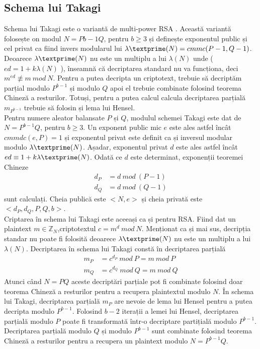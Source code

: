 \documentclass[12]{report}
\begin{document}
		  \subsection{Schema lui Takagi}
		  Schema lui Takagi este o variantă de multi-power RSA \cite{takagi}. Această variantă folosește on modul $N=P{b-1}Q$, pentru $b \geqslant 3$ și definește exponentul public și cel privat ca fiind invers modularul lui $\lambda \textprime (N) =cmmc(P-1,Q-1)$. Deoarece $\lambda \textprime (N)$ nu este un multiplu a lui $\lambda(N)$ unde ( $ed=1+k\lambda(N)$ ), înseamnă că decriptarea standard nu va funcționa, deci $m^{ed} \not\equiv m \ mod \ N$. Pentru a putea decripta un criptotext, trebuie să decriptăm parțial modulo $P^{b-1}$ și modulo $Q$ apoi el trebuie combinate folosind teorema Chineză a resturilor. Totuși, pentru a putea calcul calcula decriptarea parțială $m_{P^{b-1}}$ trebuie să folosin și lema lui Hensel.\\
		  Pentru numere aleator balansate $P$ și $Q$, modulul schemei Takagi este dat de $N=P^{b-1}Q$, pentru $b \geqslant 3$. Un exponent public mic $e$ este ales astfel încât$cmmdc(e,P)=1$ și exponentul privat este definit ca și inversul modular modulo $\lambda \textprime (N)$. Așadar, exponentul privat $d$ este ales astfel încât $ed \equiv 1+k\lambda \textprime (N)$. Odată ce $d$ este determinat, exponenții  teoremei Chineze
		  \begin{align*}
		  d_P &= d \ mod \ (P-1) \\
		  d_Q &= d \ mod \ (Q-1)
		  \end{align*}
sunt calculați. Cheia publică este $<N,e>$ și cheia privată este$<d_P,d_Q,P,Q,b>$. \\
Criptarea în schema lui Takagi este aceeași ca și pentru RSA. Fiind dat un plaintext $ m \in \mathbb{Z}_N$,criptotextul $ c= m^d \ mod \ N$. Menționat ca și mai sus, decripția standar nu poate fi folosită deoarece $ \lambda \textprime (N)$ nu este un multiplu a lui $\lambda(N)$. Decriptarea în  schema lui Takagi constă în decriptarea parțială
\begin{align*}
m_P &= c^{d_P} \ mod \ P = m \ mod \ P \\
m_Q &= c^{d_Q} \ mod \ Q = m \ mod \ Q 
\end{align*} 
Atunci când $N=PQ$ aceste decriptări parțiale pot fi combinate folosind doar teorema Chineză a resturilor pentru a recupera plaintextul modulo $N$. În schema lui Takagi, decriptarea parțială $m_P$ are nevoie de lema lui Hensel pentru a putea decripta modulo  $P^{b-1}$. Folosind $b-2$ iterații a lemei lui Hensel, decriptarea parțială modulo $P$ poate fi transformată într-o decriptare partițială modulo $P^{b-1}$. Decriptarea parțială modulo $Q$ și modulo $P^{b-1}$ sunt combinate folosind teorema Chineză a resturilor pentru a recupera un plaintext modulo $N=P^{b-1}Q$.
\end{document}

